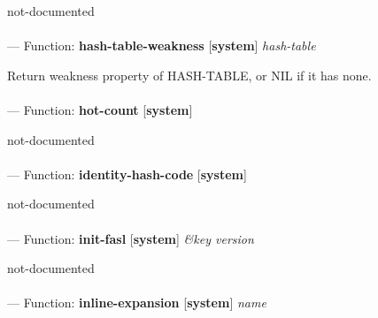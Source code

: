 \begin{adjustwidth}{5em}{5em}
not-documented
\end{adjustwidth}

\paragraph{}
\label{SYSTEM:HASH-TABLE-WEAKNESS}
--- Function: \textbf{hash-table-weakness} [\textbf{system}] \textit{hash-table}

\begin{adjustwidth}{5em}{5em}
Return weakness property of HASH-TABLE, or NIL if it has none.
\end{adjustwidth}

\paragraph{}
\label{SYSTEM:HOT-COUNT}
--- Function: \textbf{hot-count} [\textbf{system}] \textit{}

\begin{adjustwidth}{5em}{5em}
not-documented
\end{adjustwidth}

\paragraph{}
\label{SYSTEM:IDENTITY-HASH-CODE}
--- Function: \textbf{identity-hash-code} [\textbf{system}] \textit{}

\begin{adjustwidth}{5em}{5em}
not-documented
\end{adjustwidth}

\paragraph{}
\label{SYSTEM:INIT-FASL}
--- Function: \textbf{init-fasl} [\textbf{system}] \textit{\&key version}

\begin{adjustwidth}{5em}{5em}
not-documented
\end{adjustwidth}

\paragraph{}
\label{SYSTEM:INLINE-EXPANSION}
--- Function: \textbf{inline-expansion} [\textbf{system}] \textit{name}


